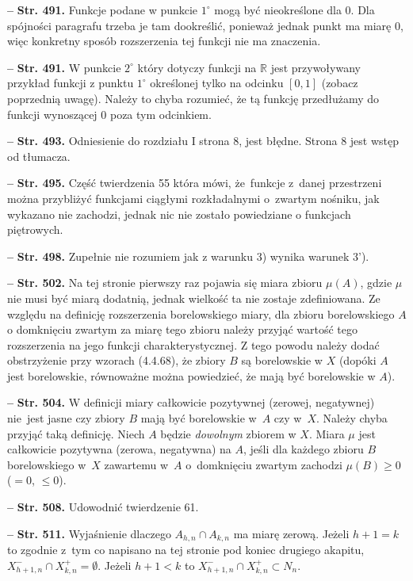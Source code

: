 \documentclass[a4paper]{article}
\newcommand{\tb}{\textbf}
\newcommand{\noi}{\noindent}
\newcommand{\start}{\noi \tb{--} {}}
\newcommand{\Str}[1]{\tb{Str. #1.}}
\begin{document}
\start \Str{491} Funkcje podane w punkcie $1^{ \circ }$ mogą być
nieokreślone dla 0. Dla spójności paragrafu trzeba je tam dookreślić,
ponieważ jednak punkt ma miarę 0, więc konkretny sposób rozszerzenia
tej funkcji nie ma znaczenia.

\start \Str{491} W punkcie $2^{ \circ }$ który dotyczy funkcji na
$\mathbb{R}$ jest przywoływany przykład funkcji z punktu $1^{ \circ }$
określonej tylko na odcinku $[ 0, 1 ]$ (zobacz poprzednią uwagę).
Należy to chyba rozumieć, że tą funkcję przedłużamy do funkcji
wynoszącej 0 poza tym odcinkiem.

\start \Str{493} Odniesienie do rozdziału I strona 8, jest błędne.
Strona 8 jest wstęp od tłumacza.

\start \Str{495} Część twierdzenia 55 która mówi, że~funkcje z~danej
przestrzeni można przybliżyć funkcjami ciągłymi rozkładalnymi
o~zwartym nośniku, jak wykazano nie zachodzi, jednak nic nie zostało
powiedziane o funkcjach piętrowych.

\start \Str{498} Zupełnie nie rozumiem jak z warunku 3) wynika warunek
3').

\start \Str{502} Na tej stronie pierwszy raz pojawia się miara zbioru
$\mu( A )$, gdzie $\mu$ nie musi być miarą dodatnią, jednak wielkość
ta nie zostaje zdefiniowana. Ze względu na definicję rozszerzenia
borelowskiego miary, dla zbioru borelowskiego $A$ o domknięciu zwartym
za miarę tego zbioru należy przyjąć wartość tego rozszerzenia na jego
funkcji charakterystycznej. Z tego powodu należy dodać obstrzyżenie
przy wzorach (4.4.68), że zbiory $B$ są borelowskie w $X$ (dopóki $A$
jest borelowskie, równoważne można powiedzieć, że mają być borelowskie
w $A$).

\start \Str{504} W definicji miary całkowicie pozytywnej (zerowej,
negatywnej) nie~jest jasne czy zbiory $B$ mają być borelowskie w~$A$
czy w~$X$. Należy chyba przyjąć taką definicję. Niech $A$ będzie
\emph{dowolnym} zbiorem w $X$. Miara $\mu$ jest całkowicie pozytywna
(zerowa, negatywna) na $A$, jeśli dla każdego zbioru $B$ borelowskiego
w~$X$ zawartemu w~$A$ o~domknięciu zwartym zachodzi $\mu( B ) \geq 0$
($= 0$, $\leq 0$).

\start \Str{508} Udowodnić twierdzenie 61.
  
\start \Str{511} Wyjaśnienie dlaczego $A_{ h, n } \cap A_{ k, n }$ ma
miarę zerową. Jeżeli $h + 1 = k$ to zgodnie z~tym co napisano na tej
stronie pod koniec drugiego akapitu,
$X^{ - }_{ h + 1, n } \cap X^{ + }_{ k, n } = \emptyset$. Jeżeli
$h + 1 < k$ to
$X^{ - }_{ h + 1, n } \cap X^{ + }_{ k, n } \subset N_{ n }$.
  
\end{document}
